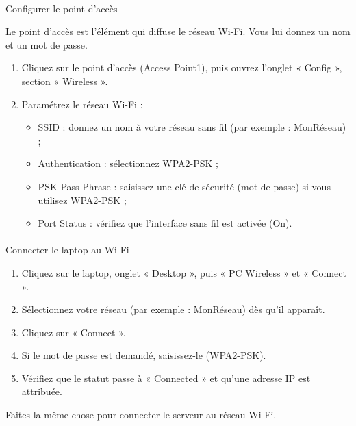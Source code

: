 \documentclass[
  french,
  10pt,
  a4paper,
]{scrartcl}
\makeatletter
\let\oldparagraph\paragraph
\renewcommand{\paragraph}{
    \@ifstar
      \xxxParagraphStar
      \xxxParagraphNoStar
  }
\newcommand{\xxxParagraphStar}[1]{\oldparagraph*{#1}\mbox{}}
\newcommand{\xxxParagraphNoStar}[1]{\oldparagraph{#1}\mbox{}}
\providecommand{\tightlist}{%
  \setlength{\itemsep}{0pt}\setlength{\parskip}{0pt}}
\makeatother
\begin{document}
\paragraph{Configurer le point
d'accès}\label{configurer-le-point-daccuxe8s}

Le point d'accès est l'élément qui diffuse le réseau Wi-Fi. Vous lui
donnez un nom et un mot de passe.

\begin{enumerate}
\def\labelenumi{\arabic{enumi}.}
\tightlist
\item
  Cliquez sur le point d'accès (Access Point1), puis ouvrez l'onglet «
  Config », section « Wireless ».
\item
  Paramétrez le réseau Wi-Fi :

  \begin{itemize}
  \tightlist
  \item
    SSID : donnez un nom à votre réseau sans fil (par exemple :
    MonRéseau) ;
  \item
    Authentication : sélectionnez WPA2-PSK ;
  \item
    PSK Pass Phrase : saisissez une clé de sécurité (mot de passe) si
    vous utilisez WPA2-PSK ;
  \item
    Port Status : vérifiez que l'interface sans fil est activée (On).
  \end{itemize}
\end{enumerate}

\paragraph{Connecter le laptop au
Wi-Fi}\label{connecter-le-laptop-au-wi-fi}

\begin{enumerate}
\def\labelenumi{\arabic{enumi}.}
\tightlist
\item
  Cliquez sur le laptop, onglet « Desktop », puis « PC Wireless » et «
  Connect ».
\item
  Sélectionnez votre réseau (par exemple : MonRéseau) dès qu'il
  apparaît.
\item
  Cliquez sur « Connect ».
\item
  Si le mot de passe est demandé, saisissez-le (WPA2-PSK).
\item
  Vérifiez que le statut passe à « Connected » et qu'une adresse IP est
  attribuée.
\end{enumerate}

Faites la même chose pour connecter le serveur au réseau Wi-Fi.
\end{document}
